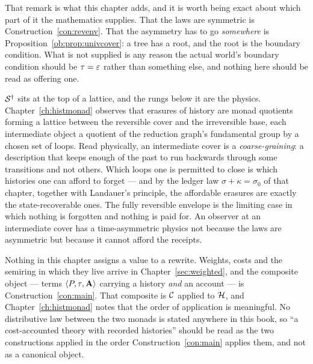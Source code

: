 That remark is what this chapter adds, and it is worth being exact about which
part of it the mathematics supplies.  That the laws are symmetric is
Construction~\ref{con:revenv}.  That the asymmetry has to go \emph{somewhere} is
Proposition~\ref{ob:prop:univcover}: a tree has a root, and the root is the
boundary condition.  What is not supplied is any reason the actual world's
boundary condition should be $\tau = \varepsilon$ rather than something else, and
nothing here should be read as offering one.

\begin{remark}
\label{rmk:coarse-cover}
$\mathcal{S}^\dagger$ sits at the top of a lattice, and the rungs below it are the
physics.
Chapter~\ref{ch:histmonad} observes that erasures of history are monad
quotients forming a lattice between the reversible cover and the irreversible
base, each intermediate object a quotient of the reduction graph's fundamental
group by a chosen set of loops.
Read physically, an intermediate cover is a \emph{coarse-graining}: a
description that keeps enough of the past to run backwards through some
transitions and not others.
Which loops one is permitted to close is which histories one can afford to
forget --- and by the ledger law $\sigma + \kappa = \sigma_0$ of that chapter,
together with Landauer's principle, the affordable erasures are exactly the
state-recoverable ones.
The fully reversible envelope is the limiting case in which nothing is
forgotten and nothing is paid for.
An observer at an intermediate cover has a time-asymmetric physics not because
the laws are asymmetric but because it cannot afford the receipts.
\end{remark}

\begin{remark}
\label{rmk:rev-undecorated}
Nothing in this chapter assigns a value to a rewrite.  Weights, costs and the
semiring in which they live arrive in Chapter~\ref{sec:weighted}, and the
composite object --- terms $\langle P, \tau, \mathbf{A}\rangle$ carrying a
history \emph{and} an account --- is Construction~\ref{con:main}.
That composite is $\mathcal{C}$ applied to $\mathcal{H}$, and Chapter~\ref{ch:histmonad}
notes that the order of application is meaningful.  No distributive law between
the two monads is stated anywhere in this book, so ``a cost-accounted theory
with recorded histories'' should be read as the two constructions applied in the
order Construction~\ref{con:main} applies them, and not as a canonical object.
\end{remark}

